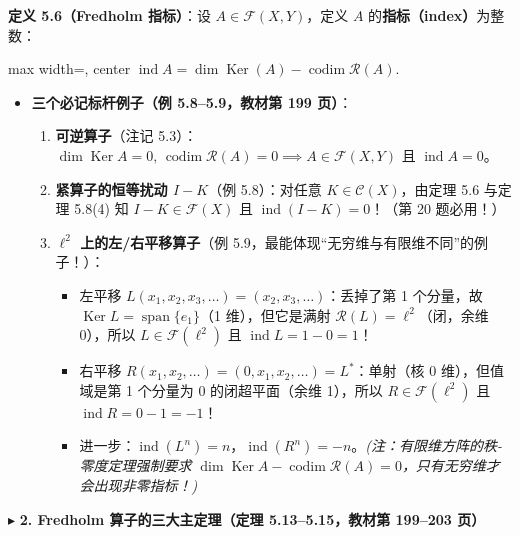\documentclass[11pt,a4paper]{article}
\providecommand{\tightlist}{\setlength{\itemsep}{2pt}\setlength{\parskip}{0pt}}
\newcommand{\SubSubHeading}[1]{%
  \Needspace{6.5\baselineskip}\vspace{5.5pt}\noindent
  \textcolor{AccentMain}{\scriptsize$\blacktriangleright$}\hspace{4pt}%
  {\small\bfseries\color{AccentMain}#1}\par\nopagebreak[4]\vspace{2.5pt}%
}
\renewenvironment{quote}{%
  \begin{tcolorbox}[
    enhanced,
    breakable,
    colback=AccentSoft!48!white,
    colframe=AccentMain,
    boxrule=0pt,
    leftrule=2.8pt,
    arc=2.5pt,
    left=9pt, right=8pt, top=6pt, bottom=6pt,
    before skip=5.5pt, after skip=5.5pt
  ]\small
}{%
  \end{tcolorbox}%
}
\newcommand{\FitDisplayMath}[1]{%
  \par\vspace{4.5pt}\noindent
  \begin{adjustbox}{max width=\linewidth, center}
    $\displaystyle #1$
  \end{adjustbox}
  \par\vspace{4.5pt}%
}
\begin{document}
\begin{quote}
\textbf{定义 5.6（Fredholm 指标）}：设 \(A \in \mathcal{F}(X, Y)\)，定义 \(A\) 的\textbf{指标（index）}为整数： 
\FitDisplayMath{\operatorname{ind} A = \dim \operatorname{Ker}(A) - \operatorname{codim} \mathcal{R}(A).}

\end{quote}

\begin{itemize}
\tightlist
\item
  \textbf{三个必记标杆例子（例 5.8--5.9，教材第 199 页）}：

  \begin{enumerate}
  \def\labelenumi{\arabic{enumi}.}
  \tightlist
  \item
    \textbf{可逆算子}（注记 5.3）：\(\dim \operatorname{Ker} A = 0, \, \operatorname{codim} \mathcal{R}(A) = 0 \implies A \in \mathcal{F}(X, Y)\) 且 \(\operatorname{ind} A = 0\)。
  \item
    \textbf{紧算子的恒等扰动 \(I - K\)}（例 5.8）：对任意 \(K \in \mathcal{C}(X)\)，由定理 5.6 与定理 5.8(4) 知 \(I - K \in \mathcal{F}(X)\) 且 \textbf{\(\operatorname{ind}(I - K) = 0\)}！（第 20 题必用！）
  \item
    \textbf{\(\ell^2\) 上的左/右平移算子}（例 5.9，最能体现``无穷维与有限维不同''的例子！）：

    \begin{itemize}
    \tightlist
    \item
      左平移 \(L(x_1, x_2, x_3, \dots) = (x_2, x_3, \dots)\)：丢掉了第 1 个分量，故 \(\operatorname{Ker} L = \operatorname{span}\{e_1\}\)（1 维），但它是满射 \(\mathcal{R}(L) = \ell^2\)（闭，余维 0），所以 \(L \in \mathcal{F}(\ell^2)\) 且 \textbf{\(\operatorname{ind} L = 1 - 0 = 1\)}！
    \item
      右平移 \(R(x_1, x_2, \dots) = (0, x_1, x_2, \dots) = L^*\)：单射（核 0 维），但值域是第 1 个分量为 0 的闭超平面（余维 1），所以 \(R \in \mathcal{F}(\ell^2)\) 且 \textbf{\(\operatorname{ind} R = 0 - 1 = -1\)}！
    \item
      进一步：\(\operatorname{ind}(L^n) = n\)，\(\operatorname{ind}(R^n) = -n\)。\emph{(注：有限维方阵的秩-零度定理强制要求 \(\dim \operatorname{Ker} A - \operatorname{codim} \mathcal{R}(A) = 0\)，只有无穷维才会出现非零指标！)}
    \end{itemize}
  \end{enumerate}
\end{itemize}

\SubSubHeading{2. Fredholm 算子的三大主定理（定理 5.13--5.15，教材第 199--203 页）}
\end{document}
